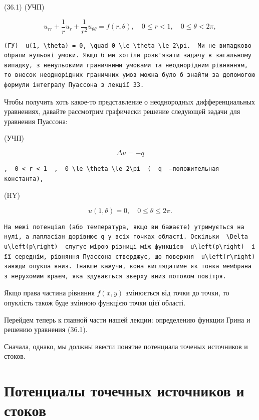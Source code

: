 \documentclass[
  ukrainian,
]{article}
\begin{document}
(36.1) (УЧП)

\[
u_{rr} + \frac{1}{r} u_r + \frac{1}{r^2} u_{\theta\theta} = f(r, \theta), \quad 0 \le r < 1, \quad 0 \le \theta < 2\pi,
\]

\begin{verbatim}
(ГУ)  u(1, \theta) = 0, \quad 0 \le \theta \le 2\pi.  Ми не випадково обрали нульові умови. Якщо б ми хотіли розв'язати задачу в загальному випадку, з ненульовими граничними умовами та неоднорідним рівнянням, то внесок неоднорідних граничних умов можна було б знайти за допомогою формули інтегралу Пуассона з лекції 33.
\end{verbatim}

Чтобы получить хоть какое-то представление о неоднородных
дифференциальных уравнениях, давайте рассмотрим графически решение
следующей задачи для уравнения Пуассона:

(УЧП)

\[
\Delta u = -q
\]

\begin{verbatim}
,  0 < r < 1  ,  0 \le \theta \le 2\pi  (  q  —положительная константа),
\end{verbatim}

(HY)

\[
u(1, \theta) = 0, \quad 0 \le \theta \le 2\pi.
\]

\begin{verbatim}
На межі потенціал (або температура, якщо ви бажаєте) утримується на нулі, а лапласіан дорівнює q у всіх точках області. Оскільки  \Delta u\left(p\right)  слугує мірою різниці між функцією  u\left(p\right)  і її середнім, рівняння Пуассона стверджує, що поверхня  u\left(r\right)  завжди опукла вниз. Інакше кажучи, вона виглядатиме як тонка мембрана з нерухомим краєм, яка здувається зверху вниз потоком повітря.
\end{verbatim}

Якщо права частина рівняння \(f(x, y)\) змінюється від точки до точки,
то опуклість також буде змінною функцією точки цієї області.

Перейдем теперь к главной части нашей лекции: определению функции Грина
и решению уравнения (36.1).

Сначала, однако, мы должны ввести понятие потенциала точеных источников
и стоков.

\section{Потенциалы точечных источников и
стоков}\label{ux43fux43eux442ux435ux43dux446ux438ux430ux43bux44b-ux442ux43eux447ux435ux447ux43dux44bux445-ux438ux441ux442ux43eux447ux43dux438ux43aux43eux432-ux438-ux441ux442ux43eux43aux43eux432}
\end{document}
